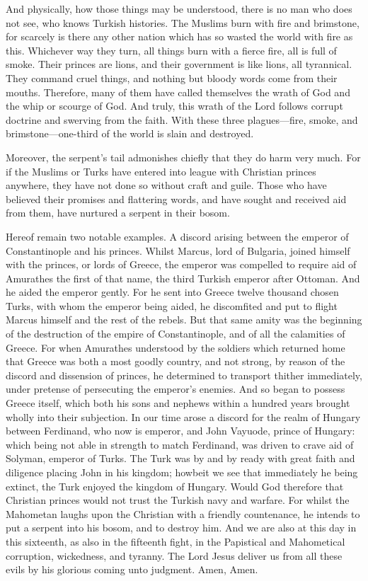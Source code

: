 And physically, how those things may be understood, there is no man who does not see, who knows Turkish histories. The Muslims burn with fire and brimstone, for scarcely is there any other nation which has so wasted the world with fire as this. Whichever way they turn, all things burn with a fierce fire, all is full of smoke. Their princes are lions, and their government is like lions, all tyrannical. They command cruel things, and nothing but bloody words come from their mouths. Therefore, many of them have called themselves the wrath of God and the whip or scourge of God. And truly, this wrath of the Lord follows corrupt doctrine and swerving from the faith. With these three plagues—fire, smoke, and brimstone—one-third of the world is slain and destroyed.

Moreover, the serpent’s tail admonishes chiefly that they do harm very much. For if the Muslims or Turks have entered into league with Christian princes anywhere, they have not done so without craft and guile. Those who have believed their promises and flattering words, and have sought and received aid from them, have nurtured a serpent in their bosom.

Hereof remain two notable examples. A discord arising between the emperor of Constantinople and his princes. Whilst Marcus, lord of Bulgaria, joined himself with the princes, or lords of Greece, the emperor was compelled to require aid of Amurathes the first of that name, the third Turkish emperor after Ottoman. And he aided the emperor gently. For he sent into Greece twelve thousand chosen Turks, with whom the emperor being aided, he discomfited and put to flight Marcus himself and the rest of the rebels. But that same amity was the beginning of the destruction of the empire of Constantinople, and of all the calamities of Greece. For when Amurathes understood by the soldiers which returned home that Greece was both a most goodly country, and not strong, by reason of the discord and dissension of princes, he determined to transport thither immediately, under pretense of persecuting the emperor’s enemies. And so began to possess Greece itself, which both his sons and nephews within a hundred years brought wholly into their subjection. In our time arose a discord for the realm of Hungary between Ferdinand, who now is emperor, and John Vayuode, prince of Hungary: which being not able in strength to match Ferdinand, was driven to crave aid of Solyman, emperor of Turks. The Turk was by and by ready with great faith and diligence placing John in his kingdom; howbeit we see that immediately he being extinct, the Turk enjoyed the kingdom of Hungary. Would God therefore that Christian princes would not trust the Turkish navy and warfare. For whilst the Mahometan laughs upon the Christian with a friendly countenance, he intends to put a serpent into his bosom, and to destroy him. And we are also at this day in this sixteenth, as also in the fifteenth fight, in the Papistical and Mahometical corruption, wickedness, and tyranny. The Lord Jesus deliver us from all these evils by his glorious coming unto judgment. Amen, Amen.
